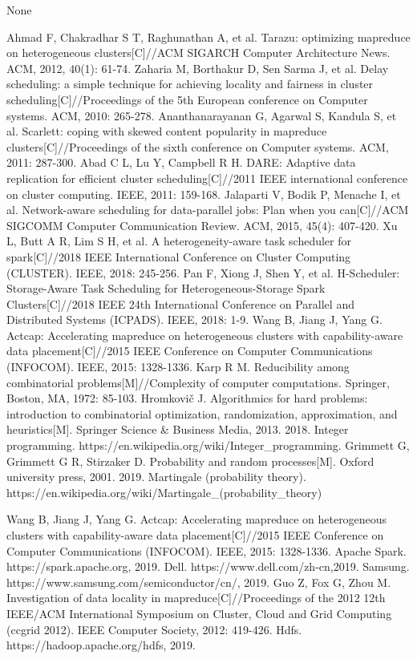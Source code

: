 \documentclass[conference]{IEEEtran}
\begin{document}
None





\begin{thebibliography}{00}
 Ahmad F, Chakradhar S T, Raghunathan A, et al. Tarazu: optimizing mapreduce on heterogeneous clusters[C]//ACM SIGARCH Computer Architecture News. ACM, 2012, 40(1): 61-74.
 Zaharia M, Borthakur D, Sen Sarma J, et al. Delay scheduling: a simple technique for achieving locality and fairness in cluster scheduling[C]//Proceedings of the 5th European conference on Computer systems. ACM, 2010: 265-278.
 Ananthanarayanan G, Agarwal S, Kandula S, et al. Scarlett: coping with skewed content popularity in mapreduce clusters[C]//Proceedings of the sixth conference on Computer systems. ACM, 2011: 287-300.
 Abad C L, Lu Y, Campbell R H. DARE: Adaptive data replication for efficient cluster scheduling[C]//2011 IEEE international conference on cluster computing. IEEE, 2011: 159-168.
 Jalaparti V, Bodik P, Menache I, et al. Network-aware scheduling for data-parallel jobs: Plan when you can[C]//ACM SIGCOMM Computer Communication Review. ACM, 2015, 45(4): 407-420.
 Xu L, Butt A R, Lim S H, et al. A heterogeneity-aware task scheduler for spark[C]//2018 IEEE International Conference on Cluster Computing (CLUSTER). IEEE, 2018: 245-256.
 Pan F, Xiong J, Shen Y, et al. H-Scheduler: Storage-Aware Task Scheduling for Heterogeneous-Storage Spark Clusters[C]//2018 IEEE 24th International Conference on Parallel and Distributed Systems (ICPADS). IEEE, 2018: 1-9.
 Wang B, Jiang J, Yang G. Actcap: Accelerating mapreduce on heterogeneous clusters with capability-aware data placement[C]//2015 IEEE Conference on Computer Communications (INFOCOM). IEEE, 2015: 1328-1336.
 Karp R M. Reducibility among combinatorial problems[M]//Complexity of computer computations. Springer, Boston, MA, 1972: 85-103.
 Hromkovič J. Algorithmics for hard problems: introduction to combinatorial optimization, randomization, approximation, and heuristics[M]. Springer Science \& Business Media, 2013.
 2018. Integer programming. https://en.wikipedia.org/wiki/Integer\_programming.
 Grimmett G, Grimmett G R, Stirzaker D. Probability and random processes[M]. Oxford university press, 2001.
 2019. Martingale (probability theory). https://en.wikipedia.org/wiki/Martingale\_(probability\_theory)

 Wang B, Jiang J, Yang G. Actcap: Accelerating mapreduce on heterogeneous clusters with capability-aware data placement[C]//2015 IEEE Conference on Computer Communications (INFOCOM). IEEE, 2015: 1328-1336.
 Apache Spark. https://spark.apache.org, 2019.
Dell. https://www.dell.com/zh-cn,2019.
Samsung. https://www.samsung.com/semiconductor/cn/, 2019.
Guo Z, Fox G, Zhou M. Investigation of data locality in mapreduce[C]//Proceedings of the 2012 12th IEEE/ACM International Symposium on Cluster, Cloud and Grid Computing (ccgrid 2012). IEEE Computer Society, 2012: 419-426.
 Hdfs. https://hadoop.apache.org/hdfs, 2019.

\end{thebibliography}
\end{document}
